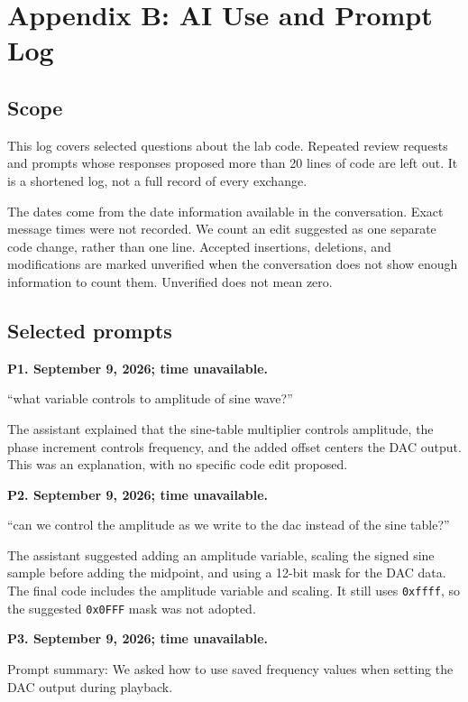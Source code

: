 \documentclass[11pt,letterpaper]{article}
\begin{document}
\clearpage
\section*{Appendix B: AI Use and Prompt Log}

\subsection*{Scope}

This log covers selected questions about the lab code. Repeated review requests and prompts whose responses proposed more than 20 lines of code are left out. It is a shortened log, not a full record of every exchange.

The dates come from the date information available in the conversation. Exact message times were not recorded. We count an edit suggested as one separate code change, rather than one line. Accepted insertions, deletions, and modifications are marked unverified when the conversation does not show enough information to count them. Unverified does not mean zero.

\subsection*{Selected prompts}

\textbf{P1. September 9, 2026; time unavailable.}

``what variable controls to amplitude of sine wave?''

The assistant explained that the sine-table multiplier controls amplitude, the phase increment controls frequency, and the added offset centers the DAC output. This was an explanation, with no specific code edit proposed.

\textbf{P2. September 9, 2026; time unavailable.}

``can we control the amplitude as we write to the dac instead of the sine table?''

The assistant suggested adding an amplitude variable, scaling the signed sine sample before adding the midpoint, and using a 12-bit mask for the DAC data. The final code includes the amplitude variable and scaling. It still uses \texttt{0xffff}, so the suggested \texttt{0x0FFF} mask was not adopted.

\textbf{P3. September 9, 2026; time unavailable.}

Prompt summary: We asked how to use saved frequency values when setting the DAC output during playback.
\end{document}
